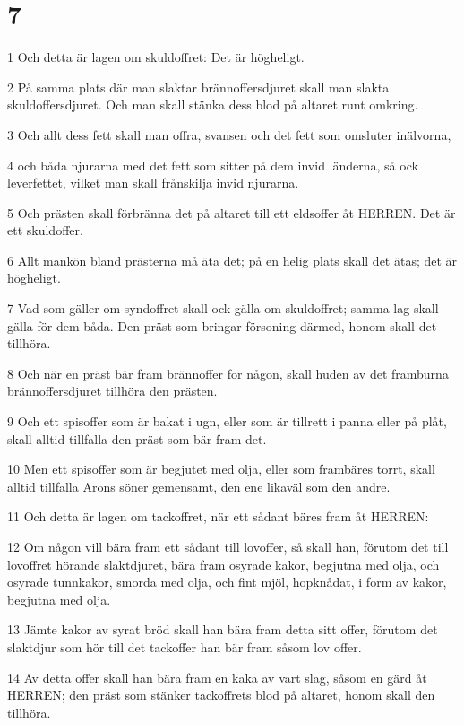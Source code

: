 \chapter{7}

\par 1 Och detta är lagen om skuldoffret: Det är högheligt.
\par 2 På samma plats där man slaktar brännoffersdjuret skall man slakta skuldoffersdjuret. Och man skall stänka dess blod på altaret runt omkring.
\par 3 Och allt dess fett skall man offra, svansen och det fett som omsluter inälvorna,
\par 4 och båda njurarna med det fett som sitter på dem invid länderna, så ock leverfettet, vilket man skall frånskilja invid njurarna.
\par 5 Och prästen skall förbränna det på altaret till ett eldsoffer åt HERREN. Det är ett skuldoffer.
\par 6 Allt mankön bland prästerna må äta det; på en helig plats skall det ätas; det är högheligt.
\par 7 Vad som gäller om syndoffret skall ock gälla om skuldoffret; samma lag skall gälla för dem båda. Den präst som bringar försoning därmed, honom skall det tillhöra.
\par 8 Och när en präst bär fram brännoffer for någon, skall huden av det framburna brännoffersdjuret tillhöra den prästen.
\par 9 Och ett spisoffer som är bakat i ugn, eller som är tillrett i panna eller på plåt, skall alltid tillfalla den präst som bär fram det.
\par 10 Men ett spisoffer som är begjutet med olja, eller som frambäres torrt, skall alltid tillfalla Arons söner gemensamt, den ene likaväl som den andre.
\par 11 Och detta är lagen om tackoffret, när ett sådant bäres fram åt HERREN:
\par 12 Om någon vill bära fram ett sådant till lovoffer, så skall han, förutom det till lovoffret hörande slaktdjuret, bära fram osyrade kakor, begjutna med olja, och osyrade tunnkakor, smorda med olja, och fint mjöl, hopknådat, i form av kakor, begjutna med olja.
\par 13 Jämte kakor av syrat bröd skall han bära fram detta sitt offer, förutom det slaktdjur som hör till det tackoffer han bär fram såsom lov offer.
\par 14 Av detta offer skall han bära fram en kaka av vart slag, såsom en gärd åt HERREN; den präst som stänker tackoffrets blod på altaret, honom skall den tillhöra.
